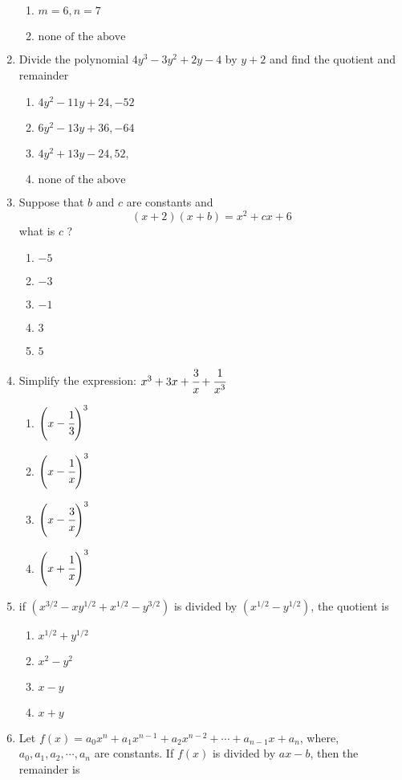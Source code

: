 \begin{multicols}{2}
\begin{enumerate}[label={\arabic*.}]
\begin{enumerate}[label={\Alph*.}]
	\item \(m = 6, n = 7\)
	\item \( \text{none of the above}\)
	\end{enumerate}
\item Divide the polynomial $4y^3 - 3y^2 + 2y -4 $ by $y + 2$ and find the quotient and remainder 
	\begin{enumerate}[label={\Alph*.}]
	\item \(4y^2 - 11y + 24, -52\)
	\item \(6y^2 - 13y + 36 , -64\)
	\item \(4y^2 + 13y - 24, 52, \)
	\item \(\text{none of the above}\)
	\end{enumerate}
\item Suppose that $b$ and $c$ are constants and $$(x+2)(x+b) = x^2 + cx + 6$$ what is $c$ ?
	\begin{enumerate}[label={\Alph*.}]
	\item \(-5\)
	\item \(-3\)
	\item \(-1\)
	\item \(3\)
	\item \(5\)
	\end{enumerate}
\item Simplify the expression: $x^3 + 3x + \cfrac{3}{x} + \cfrac{1}{x^3}$
\begin{multicols}{2}
	\begin{enumerate}[label={\Alph*.}]
	\item \(\left(x - \cfrac{1}{3}\right)^3\)
	\item \(\left(x - \cfrac{1}{x}\right)^3\)
	\item \(\left(x - \cfrac{3}{x}\right)^3\)
	\item \(\left(x + \cfrac{1}{x}\right)^3\)
	\end{enumerate}
\end{multicols}
\item if $(x^{3/2} - xy^{1/2} + x^{1/2} - y^{3/2})$ is divided by $(x^{1/2} - y^{1/2})$, the quotient is 
\begin{enumerate}[label={\Alph*.}]
	\item \(x^{1/2} + y^{1/2}\)
	\item \(x^2 - y^2\)
	\item \(x-y\)
	\item \(x+y\)
	\end{enumerate}
\item Let $f(x) = a_{0}x^{n} + a_{1}x^{n-1} + a_{2}x^{n-2} + \cdots + a_{n-1}x + a_{n}$, where, $a_{0}, a_{1}, a_{2}, \cdots, a_{n}$ are constants. If $f(x)$ is divided by $ax -b$, then the remainder is

\end{enumerate}
\end{multicols}
